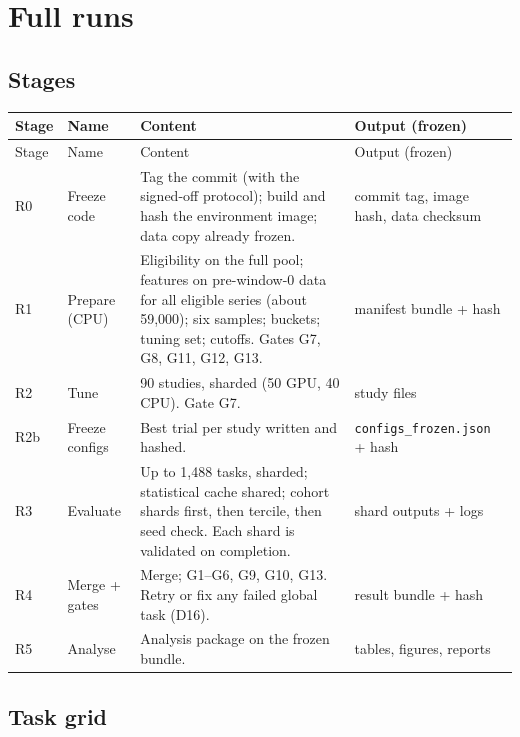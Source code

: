 \documentclass[11pt,a4paper]{article}
\newcommand{\code}[1]{\texttt{#1}}
\begin{document}
\section{Full runs}\label{sec:runs}

\subsection{Stages}

{\small
\begin{longtable}{@{}p{1.0cm} p{2.6cm} p{7.4cm} p{4.0cm}@{}}
\toprule
Stage & Name & Content & Output (frozen) \\
\midrule
\endfirsthead
\toprule
Stage & Name & Content & Output (frozen) \\
\midrule
\endhead
\bottomrule
\endfoot
R0 & Freeze code & Tag the commit (with the signed-off protocol); build and hash the environment image; data copy already frozen. & commit tag, image hash, data checksum \\
R1 & Prepare (CPU) & Eligibility on the full pool; features on pre-window-0 data for all eligible series (about 59,000); six samples; buckets; tuning set; cutoffs. Gates G7, G8, G11, G12, G13. & manifest bundle + hash \\
R2 & Tune & 90 studies, sharded (50 GPU, 40 CPU). Gate G7. & study files \\
R2b & Freeze configs & Best trial per study written and hashed. & \code{configs_frozen.json} + hash \\
R3 & Evaluate & Up to 1,488 tasks, sharded; statistical cache shared; cohort shards first, then tercile, then seed check. Each shard is validated on completion. & shard outputs + logs \\
R4 & Merge + gates & Merge; G1--G6, G9, G10, G13. Retry or fix any failed global task (D16). & result bundle + hash \\
R5 & Analyse & Analysis package on the frozen bundle. & tables, figures, reports \\
\end{longtable}
}

\subsection{Task grid}
\end{document}
